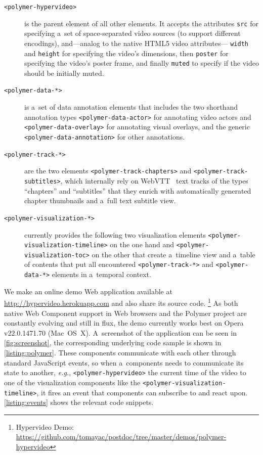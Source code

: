 \documentclass[runningheads,a4paper]{llncs}
\begin{document}
\begin{description}
  \item[\texttt{<polymer-hypervideo>}] is the parent element of all other elements.
    It accepts the attributes \texttt{src} for specifying a~set of
    space-separated video sources (to support different encodings),
    and---analog to the native HTML5 video attributes---%
    \texttt{width} and \texttt{height} for specifying the video's dimensions,
    then \texttt{poster} for specifying the video's poster frame, and finally \texttt{muted} to specify if the video should be initially muted.
  \item[\texttt{<polymer-data-*>}] is a~set of data annotation elements
    that includes the two shorthand annotation types
    \texttt{<polymer-data-actor>} for annotating video actors and
    \texttt{<polymer-data-overlay>} for annotating visual overlays,
    and the generic \texttt{<polymer-data-annotation>} for other annotations.
  \item[\texttt{<polymer-track-*>}] are the two elements
    \texttt{<polymer-track-chapters>} and \texttt{<polymer-track-subtitles>},
    which internally rely on WebVTT~\cite{pfeiffer2013webvtt} text tracks
    of the types ``chapters'' and ``subtitles'' that they enrich with
    automatically generated chapter thumbnails and a~full text subtitle view.
  \item[\texttt{<polymer-visualization-*>}] currently provides the
    following two visualization elements
    \texttt{<polymer-visualization-timeline>} on the one hand and 
    \texttt{<polymer-visualization-toc>} on the other
    that create a~timeline view and a~table of contents
    that put all encountered \texttt{<polymer-track-*>}
    and \texttt{<polymer-data-*>} elements in a~temporal context.
\end{description}

\noindent We make an online demo Web application available at
\url{http://hypervideo.herokuapp.com} and also share its source code.%
\footnote{Hypervideo Demo:
\url{https://github.com/tomayac/postdoc/tree/master/demos/polymer-hypervideo}}
As both native Web Component support in Web browsers and the Polymer project
are constantly evolving and still in flux, the demo currently works best on
Opera v22.0.1471.70	(Mac~OS~X).
A~screenshot of the application can be seen in \autoref{fig:screenshot},
the corresponding underlying code sample is shown in \autoref{listing:polymer}.
These components communicate with each other through standard JavaScript events,
so when a~components needs to communicate its state to another, \emph{e.g.},
\texttt{<polymer-hypervideo>} the current time of the video to one of the
visualization components like the \texttt{<polymer-visualization-timeline>},
it fires an event that components can subscribe to and react upon.
\autoref{listing:events} shows the relevant code snippets.
\end{document}
